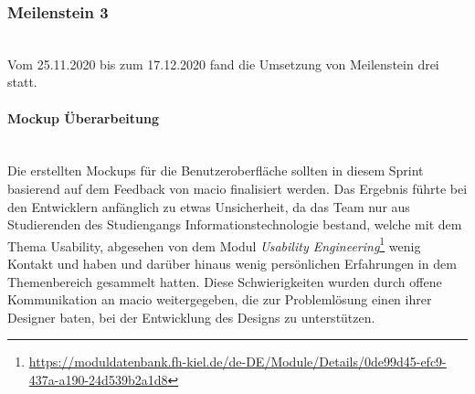 \documentclass[10pt, a4paper]{article}
\begin{document}
\subsubsection*{Meilenstein 3} $~$ \\
Vom 25.11.2020 bis zum 17.12.2020 fand die Umsetzung von Meilenstein drei statt.

\paragraph*{Mockup Überarbeitung} $~$ \\
Die erstellten Mockups für die Benutzeroberfläche sollten in diesem Sprint basierend auf dem Feedback von macio finalisiert werden.
Das Ergebnis führte bei den Entwicklern anfänglich zu etwas Unsicherheit, da das Team nur aus Studierenden des Studiengangs
Informationstechnologie bestand, welche mit dem Thema Usability, abgesehen von dem Modul
\textit{Usability Engineering}\footnote{\raggedright\url{https://moduldatenbank.fh-kiel.de/de-DE/Module/Details/0de99d45-efc9-437a-a190-24d539b2a1d8}}
wenig Kontakt und haben und darüber hinaus wenig persönlichen Erfahrungen in dem Themenbereich gesammelt hatten.
Diese Schwierigkeiten wurden durch offene Kommunikation an macio weitergegeben, die zur Problemlösung einen ihrer Designer baten,
bei der Entwicklung des Designs zu unterstützen.
\end{document}
